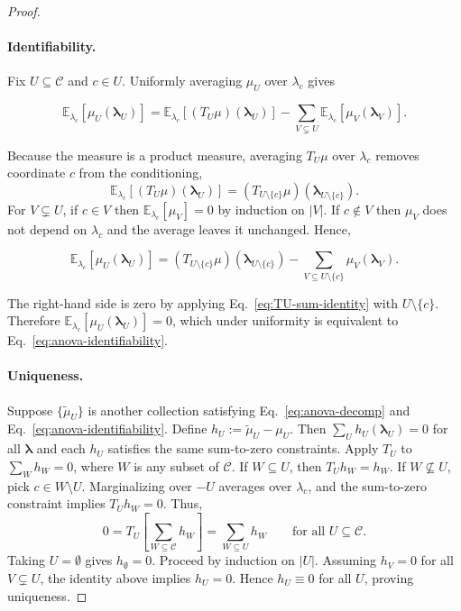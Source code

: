 \begin{proof}
\paragraph{Identifiability.}
Fix $U\subseteq\mathcal{C}$ and $c\in U$. Uniformly averaging $\mu_U$ over
$\lambda_c$ gives

{\small
\begin{equation}
\mathbb{E}_{\lambda_c}\!\left[\mu_U(\boldsymbol{\lambda}_U)\right]
=
\mathbb{E}_{\lambda_c}\!\left[(T_U\mu)(\boldsymbol{\lambda}_U)\right]
-
\sum_{V\subsetneq U}\mathbb{E}_{\lambda_c}\!\left[\mu_V(\boldsymbol{\lambda}_V)\right].  
\end{equation}
}

Because the measure is a product measure, averaging $T_U\mu$ over $\lambda_c$
removes coordinate $c$ from the conditioning,
\[
\mathbb{E}_{\lambda_c}\!\left[(T_U\mu)(\boldsymbol{\lambda}_U)\right]
=
(T_{U\setminus\{c\}}\mu)(\boldsymbol{\lambda}_{U\setminus\{c\}}).
\]
For $V\subsetneq U$, if $c\in V$ then $\mathbb{E}_{\lambda_c}[\mu_V]=0$ by
induction on $|V|$. If $c\notin V$ then $\mu_V$ does not depend on $\lambda_c$
and the average leaves it unchanged. Hence,

{\small
\begin{equation}
\mathbb{E}_{\lambda_c}\!\left[\mu_U(\boldsymbol{\lambda}_U)\right]
= 
(T_{U\setminus\{c\}}\mu)(\boldsymbol{\lambda}_{U\setminus\{c\}})
-
\sum_{V\subseteq U\setminus\{c\}}\mu_V(\boldsymbol{\lambda}_V).  
\end{equation}
}

The right-hand side is zero by applying Eq.~\eqref{eq:TU-sum-identity} with
$U\setminus\{c\}$. 
Therefore
$\mathbb{E}_{\lambda_c}[\mu_U(\boldsymbol{\lambda}_U)]=0$, which under uniformity
is equivalent to Eq.~\eqref{eq:anova-identifiability}.





\paragraph{Uniqueness.}


Suppose $\{\tilde\mu_U\}$ is another collection satisfying
Eq.~\eqref{eq:anova-decomp} and Eq.~\eqref{eq:anova-identifiability}. Define
$h_U:=\tilde\mu_U-\mu_U$. Then $\sum_{U}h_U(\boldsymbol{\lambda}_U)=0$ for all
$\boldsymbol{\lambda}$ and each $h_U$ satisfies the same sum-to-zero constraints.
Apply $T_U$ to $\sum_W h_W=0$, where $W$ is any subset of $\mathcal{C}$. If $W\subseteq U$, then $T_U h_W=h_W$. If
$W\not\subseteq U$, pick $c\in W\setminus U$. 
Marginalizing over $-U$ averages
over $\lambda_c$, and the sum-to-zero constraint implies $T_U h_W=0$. Thus,
\[
0
=
T_U\!\left[\sum_{W\subseteq\mathcal{C}} h_W\right]
=
\sum_{W\subseteq U} h_W
\qquad\text{for all }U\subseteq\mathcal{C}.
\]
Taking $U=\emptyset$ gives $h_\emptyset=0$. Proceed by induction on $|U|$.
Assuming $h_V=0$ for all $V\subsetneq U$, the identity above implies $h_U=0$.
Hence $h_U\equiv 0$ for all $U$, proving uniqueness.
\end{proof}

